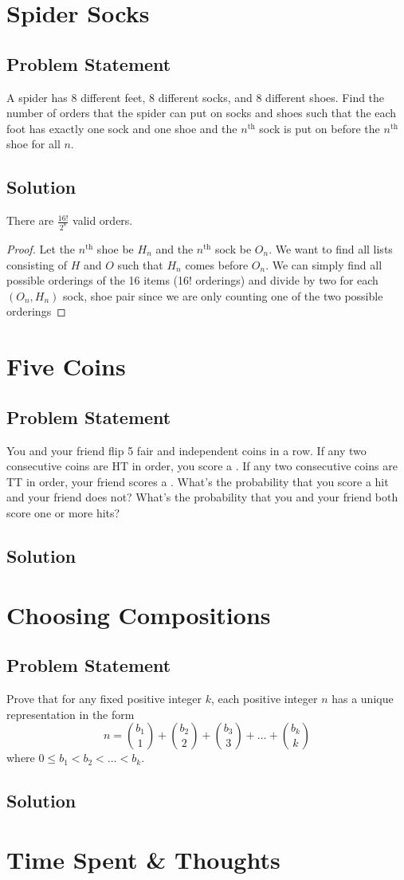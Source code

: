 \documentclass[12pt]{article}
\newcommand{\ProblemStatement}[1]{
\subsection*{Problem Statement}
#1
\subsection*{Solution}
}
\begin{document}
\section{Spider Socks}
\ProblemStatement{
A spider has 8 different feet, 8 different socks, and 8 different shoes. Find the number of orders that the spider can put on socks and shoes such that the each foot has exactly one sock and one shoe and the $n^{\text{th}}$ sock is put on before the $n^{\text{th}}$ shoe for all $n$.}

There are $\frac{16!}{2^8}$ valid orders. 

\begin{proof}
Let the $n^{\text{th}}$ shoe be $H_n$ and the $n^{\text{th}}$ sock be $O_n$. We want to find all lists consisting of $H$ and $O$ such that $H_n$ comes before $O_n$. We can simply find all possible orderings of the 16 items (16! orderings) and divide by two for each $(O_n, H_n)$ sock, shoe pair since we are only counting one of the two possible orderings
\end{proof}


\section{Five Coins}
\ProblemStatement{
You and your friend flip 5 fair and independent coins in a row. If any two consecutive coins are HT in order, you score a \say{hit}. If any two consecutive coins are TT in order, your friend scores a \say{hit}. What's the probability that you score a hit and your friend does not? What's the probability that you and your friend both score one or more hits?
}


\section{Choosing Compositions}
\ProblemStatement{
Prove that for any fixed positive integer $k$, each positive integer $n$ has a unique representation in the form 
\[
    n = \binom{b_1}{1} + \binom{b_2}{2} + \binom{b_3}{3} +\dots + \binom{b_k}{k} 
\]
where $0 \le b_1 < b_2 < \dots < b_k$.
}



\section{Time Spent \& Thoughts}
\end{document}
